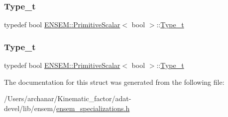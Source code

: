 \mbox{\label{structENSEM_1_1PrimitiveScalar_3_01bool_01_4_a3433ef77cf65b05846eddc474f588a73}} 
\subsubsection{\texorpdfstring{Type\_t}{Type\_t}\hspace{0.1cm}{\footnotesize\ttfamily [2/3]}}
{\footnotesize\ttfamily typedef bool \mbox{\hyperlink{structENSEM_1_1PrimitiveScalar}{E\+N\+S\+E\+M\+::\+Primitive\+Scalar}}$<$ bool $>$\+::\mbox{\hyperlink{structENSEM_1_1PrimitiveScalar_3_01bool_01_4_a3433ef77cf65b05846eddc474f588a73}{Type\+\_\+t}}}

\mbox{\label{structENSEM_1_1PrimitiveScalar_3_01bool_01_4_a3433ef77cf65b05846eddc474f588a73}} 
\subsubsection{\texorpdfstring{Type\_t}{Type\_t}\hspace{0.1cm}{\footnotesize\ttfamily [3/3]}}
{\footnotesize\ttfamily typedef bool \mbox{\hyperlink{structENSEM_1_1PrimitiveScalar}{E\+N\+S\+E\+M\+::\+Primitive\+Scalar}}$<$ bool $>$\+::\mbox{\hyperlink{structENSEM_1_1PrimitiveScalar_3_01bool_01_4_a3433ef77cf65b05846eddc474f588a73}{Type\+\_\+t}}}



The documentation for this struct was generated from the following file\+:\begin{DoxyCompactItemize}
\item 
/\+Users/archanar/\+Kinematic\+\_\+factor/adat-\/devel/lib/ensem/\mbox{\hyperlink{adat-devel_2lib_2ensem_2ensem__specializations_8h}{ensem\+\_\+specializations.\+h}}\end{DoxyCompactItemize}
